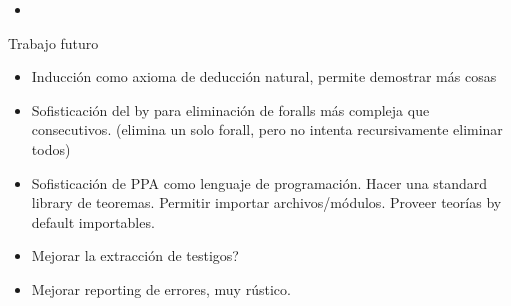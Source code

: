 \begin{itemize}
    \item {}
\end{itemize}

Trabajo futuro

\begin{itemize}
    \item Inducción como axioma de deducción natural, permite demostrar más cosas
    \item Sofisticación del by para eliminación de foralls más compleja que
    consecutivos. (elimina un solo forall, pero no intenta recursivamente
    eliminar todos)
    \item Sofisticación de PPA como lenguaje de programación. Hacer una standard library de
    teoremas. Permitir importar archivos/módulos. Proveer teorías by default importables.
    \item Mejorar la extracción de testigos?
    \item Mejorar reporting de errores, muy rústico.
\end{itemize}